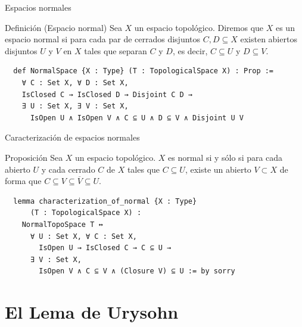 \documentclass{beamer}
\begin{document}
\begin{frame}[fragile]{Espacios normales}
  
  \begin{block}{Definición (Espacio normal)}
     Sea $X$ un espacio topológico. Diremos que $X$ es un espacio \textnormal{normal} si para cada par de cerrados disjuntos $C, D \subseteq X$ existen abiertos disjuntos $U$ y $V$ en $X$ tales que separan $C$ y $D$, es decir, $C \subseteq U$ y $D \subseteq V$.
  \end{block}

  \begin{lstlisting}
  def NormalSpace {X : Type} (T : TopologicalSpace X) : Prop :=
    ∀ C : Set X, ∀ D : Set X,
    IsClosed C → IsClosed D → Disjoint C D →
    ∃ U : Set X, ∃ V : Set X,
      IsOpen U ∧ IsOpen V ∧ C ⊆ U ∧ D ⊆ V ∧ Disjoint U V \end{lstlisting}
\end{frame}

\begin{frame}[fragile]{Caracterización de espacios normales}
  
  \begin{block}{Proposición}
    Sea $X$ un espacio topológico. $X$ es normal si y sólo si para cada abierto $U$ y cada cerrado $C$ de $X$ tales que $C \subseteq U$, existe un abierto $V \subset X$ de forma que $C \subseteq V \subseteq \overline{V} \subseteq U$.
  \end{block}

  \begin{lstlisting}
  lemma characterization_of_normal {X : Type}
      (T : TopologicalSpace X) :
    NormalTopoSpace T ↔
      ∀ U : Set X, ∀ C : Set X,
        IsOpen U → IsClosed C → C ⊆ U →
      ∃ V : Set X,
        IsOpen V ∧ C ⊆ V ∧ (Closure V) ⊆ U := by sorry \end{lstlisting}

\end{frame}

\section{El Lema de Urysohn}
\end{document}

